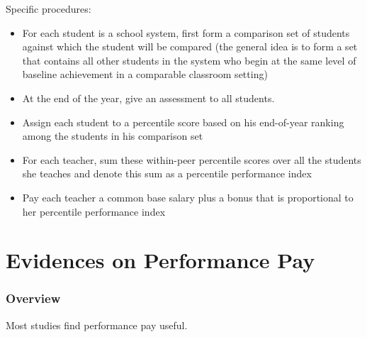         Specific procedures:
        \begin{itemize}
            \item For each student is a school system, first form a comparison set of students against which the student will be compared (the general idea is to form a set that contains all other students in the system who begin at the same level of baseline achievement in a comparable classroom setting)
            \item At the end of the year, give an assessment to all students.
            \item Assign each student to a percentile score based on his end-of-year ranking among the students in his comparison set
            \item For each teacher, sum these within-peer percentile scores over all the students she teaches and denote this sum as a percentile performance index
            \item Pay each teacher a common base salary plus a bonus that is proportional to her percentile performance index
        \end{itemize}

\section{Evidences on Performance Pay}

    \subsubsection{Overview}

        Most studies find performance pay useful.

